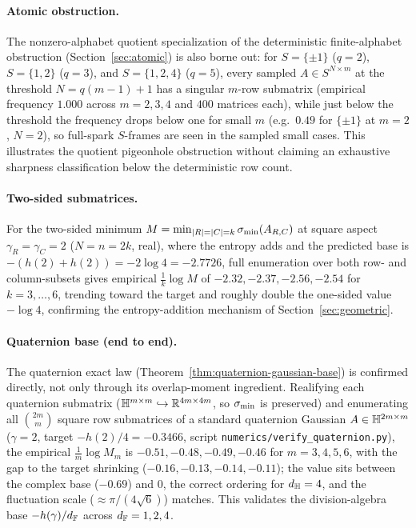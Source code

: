 \paragraph{Atomic obstruction.}
The nonzero-alphabet quotient specialization of the deterministic finite-alphabet
obstruction (Section~\ref{sec:atomic}) is also borne out:
for $S=\{\pm1\}$ ($q=2$), $S=\{1,2\}$ ($q=3$), and $S=\{1,2,4\}$ ($q=5$), every sampled
$A\in S^{N\times m}$ at the threshold $N=q(m-1)+1$ has a singular $m$-row submatrix (empirical
frequency $1.000$ across $m=2,3,4$ and $400$ matrices each), while just below the threshold the
frequency drops below one for small $m$ (e.g.\ $0.49$ for $\{\pm1\}$ at $m=2$, $N=2$), so
full-spark \(S\)-frames are seen in the sampled small cases.  This illustrates
the quotient pigeonhole obstruction without claiming an exhaustive sharpness
classification below the deterministic row count.

\paragraph{Two-sided submatrices.}
For the two-sided minimum $M=\min_{|R|=|C|=k}\sigma_{\min}(A_{R,C})$ at square aspect
$\gamma_R=\gamma_C=2$ ($N=n=2k$, real), where the entropy adds and the predicted base is
$-(h(2)+h(2))=-2\log4=-2.7726$, full enumeration over both row- and column-subsets gives
empirical $\tfrac1k\log M$ of $-2.32,-2.37,-2.56,-2.54$ for $k=3,\dots,6$, trending toward the
target and roughly double the one-sided value $-\log4$, confirming the entropy-addition
mechanism of Section~\ref{sec:geometric}.

\paragraph{Quaternion base (end to end).}
The quaternion exact law (Theorem~\ref{thm:quaternion-gaussian-base}) is confirmed directly, not
only through its overlap-moment ingredient.  Realifying each quaternion submatrix
($\mathbb{H}^{m\times m}\hookrightarrow\mathbb{R}^{4m\times4m}$, so $\sigma_{\min}$ is preserved) and enumerating all
$\binom{2m}{m}$ square row submatrices of a standard quaternion Gaussian $A\in\mathbb{H}^{2m\times m}$
($\gamma=2$, target $-h(2)/4=-0.3466$, script \texttt{numerics/verify\_quaternion.py}), the
empirical $\tfrac1m\log M_m$ is $-0.51,-0.48,-0.49,-0.46$ for $m=3,4,5,6$, with the gap to the
target shrinking ($-0.16,-0.13,-0.14,-0.11$); the value sits between the complex base
($-0.69$) and $0$, the correct ordering for $d_{\mathbb{H}}=4$, and the fluctuation scale
($\approx\pi/(4\sqrt6)$) matches.  This validates the division-algebra base $-h(\gamma)/d_{\mathbb{F}}$
across $d_{\mathbb{F}}=1,2,4$.
